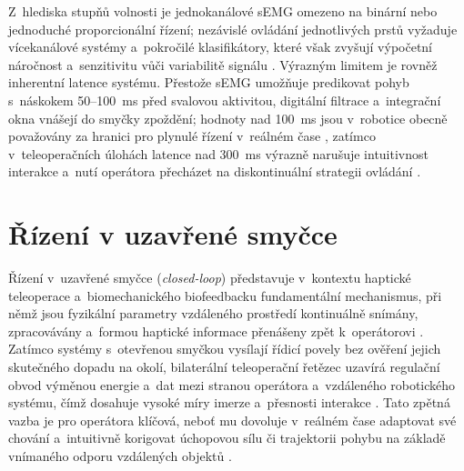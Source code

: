 Z~hlediska stupňů volnosti je jednokanálové sEMG omezeno na binární nebo jednoduché proporcionální řízení; nezávislé ovládání jednotlivých prstů vyžaduje vícekanálové systémy a~pokročilé klasifikátory, které však zvyšují výpočetní náročnost a~senzitivitu vůči variabilitě signálu \cite{Song2023823, Sul2025627}.
Výrazným limitem je rovněž inherentní latence systému.
Přestože sEMG umožňuje predikovat pohyb s~náskokem 50–100~ms před svalovou aktivitou, digitální filtrace a~integrační okna vnášejí do smyčky zpoždění; hodnoty nad 100~ms jsou v~robotice obecně považovány za hranici pro plynulé řízení v~reálném čase \cite{Lee20241121, Song2023823, Sul2025627}, zatímco v~teleoperačních úlohách latence nad 300~ms výrazně narušuje intuitivnost interakce a~nutí operátora přecházet na diskontinuální strategii ovládání \cite{Almeida202098, Bolarinwa2022}.

\section{Řízení v uzavřené smyčce}
Řízení v~uzavřené smyčce (\textit{closed-loop}) představuje v~kontextu haptické teleoperace a~biomechanického biofeedbacku fundamentální mechanismus, při němž jsou fyzikální parametry vzdáleného prostředí kontinuálně snímány, zpracovávány a~formou haptické informace přenášeny zpět k~operátorovi \cite{Kos2018, Suman2025, GIUDICI2025}.
Zatímco systémy s~otevřenou smyčkou vysílají řídicí povely bez ověření jejich skutečného dopadu na okolí, bilaterální teleoperační řetězec uzavírá regulační obvod výměnou energie a~dat mezi stranou operátora a~vzdáleného robotického systému, čímž dosahuje vysoké míry imerze a~přesnosti interakce \cite{Aijaz2018, GIUDICI2025, Thomas2023110}.
Tato zpětná vazba je pro operátora klíčová, neboť mu dovoluje v~reálném čase adaptovat své chování a~intuitivně korigovat úchopovou sílu či trajektorii pohybu na základě vnímaného odporu vzdálených objektů \cite{Mayer2020427, Suman2025, Thomas2023110}.

